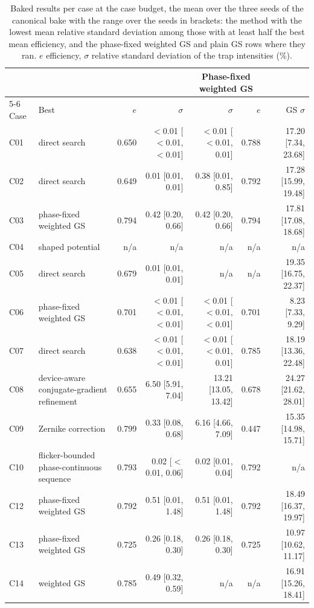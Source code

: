 \begin{table}[t]\centering\scriptsize\setlength{\tabcolsep}{3pt}
\caption{Baked results per case at the case budget, the mean over the three seeds of the canonical bake with the range over the seeds in brackets: the method with the lowest mean relative standard deviation among those with at least half the best mean efficiency, and the phase-fixed weighted GS and plain GS rows where they ran. $e$ efficiency, $\sigma$ relative standard deviation of the trap intensities (\%).}\label{tab:results}
\begin{tabular}{@{}l >{\raggedright\arraybackslash}p{} r r r r r@{}}\toprule & & & & \multicolumn{2}{c}{Phase-fixed weighted GS} & \\
\cmidrule(lr){5-6} Case & Best & $e$ & $\sigma$ & $\sigma$ & $e$ & GS $\sigma$\\\midrule
C01 & direct search & 0.650 & $<$0.01 [$<$0.01, $<$0.01] & $<$0.01 [$<$0.01, 0.01] & 0.788 & 17.20 [7.34, 23.68]\\
C02 & direct search & 0.649 & 0.01 [0.01, 0.01] & 0.38 [0.01, 0.85] & 0.792 & 17.28 [15.99, 19.48]\\
C03 & phase-fixed weighted GS & 0.794 & 0.42 [0.20, 0.66] & 0.42 [0.20, 0.66] & 0.794 & 17.81 [17.08, 18.68]\\
C04 & shaped potential & n/a & n/a & n/a & n/a & n/a\\
C05 & direct search & 0.679 & 0.01 [0.01, 0.01] & n/a & n/a & 19.35 [16.75, 22.37]\\
C06 & phase-fixed weighted GS & 0.701 & $<$0.01 [$<$0.01, $<$0.01] & $<$0.01 [$<$0.01, $<$0.01] & 0.701 & 8.23 [7.33, 9.29]\\
C07 & direct search & 0.638 & $<$0.01 [$<$0.01, $<$0.01] & $<$0.01 [$<$0.01, 0.01] & 0.785 & 18.19 [13.36, 22.48]\\
C08 & device-aware conjugate-gradient refinement & 0.655 & 6.50 [5.91, 7.04] & 13.21 [13.05, 13.42] & 0.678 & 24.27 [21.62, 28.01]\\
C09 & Zernike correction & 0.799 & 0.33 [0.08, 0.68] & 6.16 [4.66, 7.09] & 0.447 & 15.35 [14.98, 15.71]\\
C10 & flicker-bounded phase-continuous sequence & 0.793 & 0.02 [$<$0.01, 0.06] & 0.02 [0.01, 0.04] & 0.792 & n/a\\
C12 & phase-fixed weighted GS & 0.792 & 0.51 [0.01, 1.48] & 0.51 [0.01, 1.48] & 0.792 & 18.49 [16.37, 19.97]\\
C13 & phase-fixed weighted GS & 0.725 & 0.26 [0.18, 0.30] & 0.26 [0.18, 0.30] & 0.725 & 10.97 [10.62, 11.17]\\
C14 & weighted GS & 0.785 & 0.49 [0.32, 0.59] & n/a & n/a & 16.91 [15.26, 18.41]\\
\bottomrule\end{tabular}\end{table}
